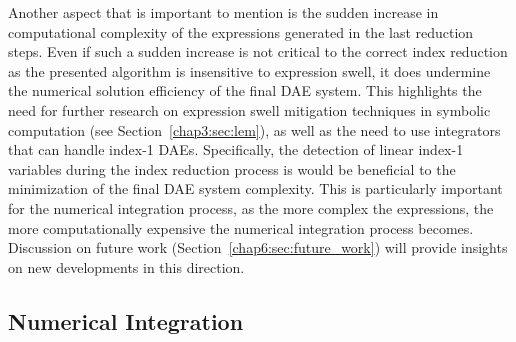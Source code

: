 Another aspect that is important to mention is the sudden increase in computational complexity of the expressions generated in the last reduction steps. Even if such a sudden increase is not critical to the correct index reduction as the presented algorithm is insensitive to expression swell, it does undermine the numerical solution efficiency of the final \ac{DAE} system. This highlights the need for further research on expression swell mitigation techniques in symbolic computation (see Section~\ref{chap3:sec:lem}), as well as the need to use integrators that can handle index-1 \acp{DAE}. Specifically, the detection of linear index-1 variables during the index reduction process is would be beneficial to the minimization of the final \ac{DAE} system complexity. This is particularly important for the numerical integration process, as the more complex the expressions, the more computationally expensive the numerical integration process becomes. Discussion on future work (Section~\ref{chap6:sec:future_work}) will provide insights on new developments in this direction.

\subsection{Numerical Integration}

